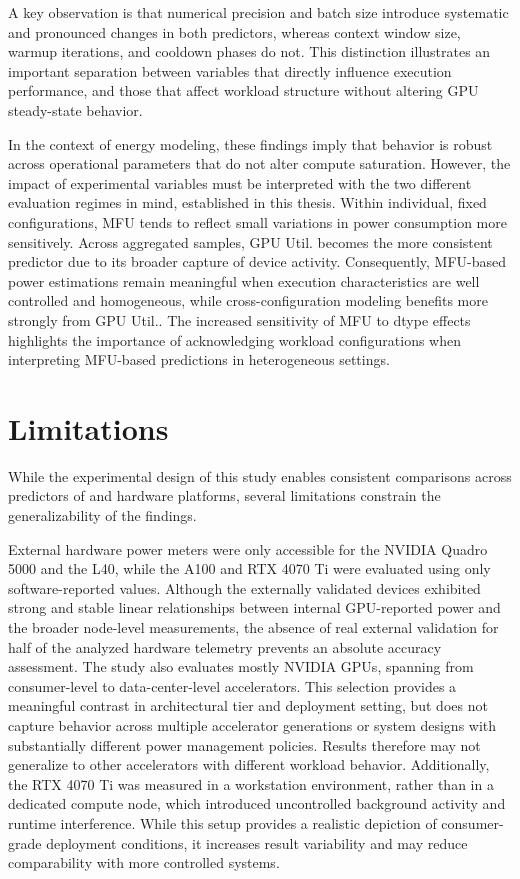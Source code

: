 \documentclass[runningheads]{llncs}
\begin{document}
A key observation is that numerical precision and batch size introduce systematic and pronounced changes in both predictors, whereas context window size, warmup iterations, and cooldown phases do not. This distinction illustrates an important separation between variables that directly influence execution performance, and those that affect workload structure without altering GPU steady-state behavior. 

In the context of energy modeling, these findings imply that behavior is robust across operational parameters that do not alter compute saturation. However, the impact of experimental variables must be interpreted with the two different evaluation regimes in mind, established in this thesis. Within individual, fixed configurations, MFU tends to reflect small variations in power consumption more sensitively. Across aggregated samples, GPU Util. becomes the more consistent predictor due to its broader capture of device activity. Consequently, MFU-based power estimations remain meaningful when execution characteristics are well controlled and homogeneous, while cross-configuration modeling benefits more strongly from GPU Util.. The increased sensitivity of MFU to dtype effects highlights the importance of acknowledging workload configurations when interpreting MFU-based predictions in heterogeneous settings.



\section{Limitations}\label{Limitations}
While the experimental design of this study enables consistent comparisons across predictors of and hardware platforms, several limitations constrain the generalizability of the findings.

External hardware power meters were only accessible for the NVIDIA Quadro 5000 and the L40, while the A100 and RTX 4070 Ti were evaluated using only software-reported values. Although the externally validated devices exhibited strong and stable linear relationships between internal GPU-reported power and the broader node-level measurements, the absence of real external validation for half of the analyzed hardware telemetry prevents an absolute accuracy assessment. 
The study also evaluates mostly NVIDIA GPUs, spanning from consumer-level to data-center-level accelerators. This selection provides a meaningful contrast in architectural tier and deployment setting, but does not capture behavior across multiple accelerator generations or system designs with substantially different power management policies. Results therefore may not generalize to other accelerators with different workload behavior.
Additionally, the RTX 4070 Ti was measured in a workstation environment, rather than in a dedicated compute node, which introduced uncontrolled background activity and runtime interference. While this setup provides a realistic depiction of consumer-grade deployment conditions, it increases result variability and may reduce comparability with more controlled systems.
\end{document}

